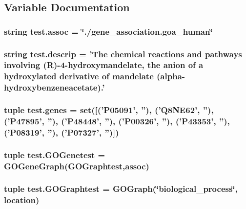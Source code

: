\subsection{Variable Documentation}
\hypertarget{namespacetest_adb8b1e2a5df72522e42bc012571e75cd}{
\subsubsection[{assoc}]{\setlength{\rightskip}{0pt plus 5cm}string {\bf test.assoc} = \char`\"{}./gene\_\-association.goa\_\-human\char`\"{}}}
\label{namespacetest_adb8b1e2a5df72522e42bc012571e75cd}
\hypertarget{namespacetest_afe7b4432163ad853f4fcd650d0ecab8c}{
\subsubsection[{descrip}]{\setlength{\rightskip}{0pt plus 5cm}string {\bf test.descrip} = 'The chemical reactions and pathways involving (R)-\/4-\/hydroxymandelate, the anion of a hydroxylated derivative of mandelate (alpha-\/hydroxybenzeneacetate).'}}
\label{namespacetest_afe7b4432163ad853f4fcd650d0ecab8c}
\hypertarget{namespacetest_a836657c6fd789469b5cbdd3c88513f7f}{
\subsubsection[{genes}]{\setlength{\rightskip}{0pt plus 5cm}tuple {\bf test.genes} = set(\mbox{[}('P05091', ''), ('Q8NE62', ''), ('P47895', ''), ('P48448', ''), ('P00326', ''), ('P43353', ''), ('P08319', ''), ('P07327', '')\mbox{]})}}
\label{namespacetest_a836657c6fd789469b5cbdd3c88513f7f}
\hypertarget{namespacetest_ab48a47ac8dcf21d32cff24c492f085c1}{
\subsubsection[{GOGenetest}]{\setlength{\rightskip}{0pt plus 5cm}tuple {\bf test.GOGenetest} = {\bf GOGeneGraph}({\bf GOGraphtest},{\bf assoc})}}
\label{namespacetest_ab48a47ac8dcf21d32cff24c492f085c1}
\hypertarget{namespacetest_a49256f3800de70e9aabf11ea0c3bb8e1}{
\subsubsection[{GOGraphtest}]{\setlength{\rightskip}{0pt plus 5cm}tuple {\bf test.GOGraphtest} = {\bf GOGraph}(\char`\"{}biological\_\-process\char`\"{}, location)}}

